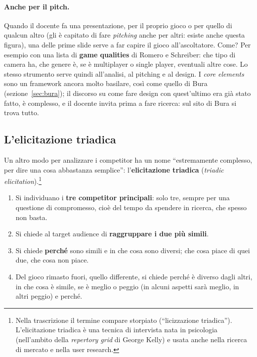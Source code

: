 \paragraph{Anche per il pitch.} Quando il docente fa una presentazione, per
il proprio gioco o per quello di qualcun altro (gli è capitato di fare
\emph{pitching} anche per altri: esiste anche questa figura), una delle
prime slide serve a far capire il gioco all'ascoltatore. Come? Per esempio
con una lista di \textbf{game qualities} di Romero e Schreiber: che tipo di
camera ha, che genere è, se è multiplayer o single player, eventuali altre
cose. Lo stesso strumento serve quindi all'analisi, al pitching e al design.
I \emph{core elements} sono un framework ancora molto basilare, così come
quello di Bura (sezione~\ref{sec:bura}); il discorso su come fare design con
quest'ultimo era già stato fatto, è complesso, e il docente invita prima a
fare ricerca: sul sito di Bura si trova tutto.

\subsection{L'elicitazione triadica}

Un altro modo per analizzare i competitor ha un nome ``estremamente
complesso, per dire una cosa abbastanza semplice'': l'\textbf{elicitazione
triadica} (\emph{triadic elicitation}).\footnote{Nella trascrizione il termine
compare storpiato (``licizzazione triadica''). L'elicitazione triadica è una
tecnica di intervista nata in psicologia (nell'ambito della \emph{repertory
grid} di George Kelly) e usata anche nella ricerca di mercato e nella user
research.}
\begin{enumerate}
  \item Si individuano i \textbf{tre competitor principali}: solo tre, sempre
        per una questione di compromesso, cioè del tempo da spendere in
        ricerca, che spesso non basta.
  \item Si chiede al target audience di \textbf{raggruppare i due più
        simili}.
  \item Si chiede \textbf{perché} sono simili e in che cosa sono diversi;
        che cosa piace di quei due, che cosa non piace.
  \item Del gioco rimasto fuori, quello differente, si chiede perché è
        diverso dagli altri, in che cosa è simile, se è meglio o peggio (in
        alcuni aspetti sarà meglio, in altri peggio) e perché.
\end{enumerate}

